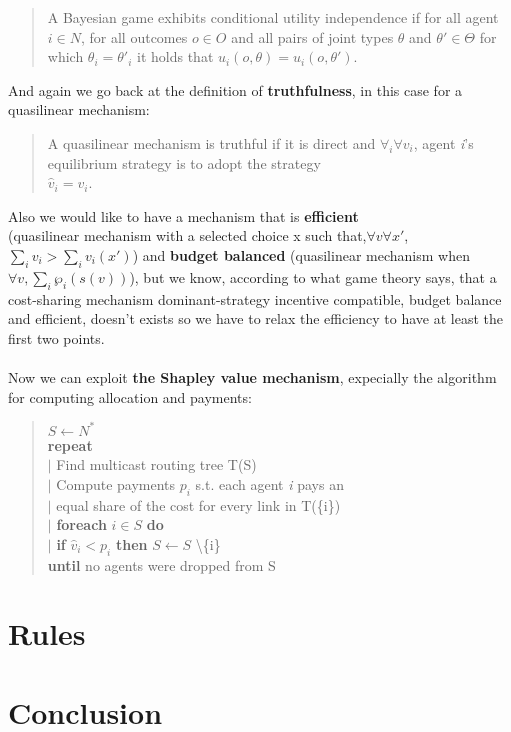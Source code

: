 \documentclass{article}
\begin{document}
{\begin{quote}
    A Bayesian game exhibits conditional utility independence if for all agent $i \in N$, for all outcomes $o \in O$ and all pairs of joint types $\theta$ and $\theta' \in \Theta$ for which $\theta_i = \theta'_i$ it holds that $u_i(o,\theta) = u_i(o,\theta')$. 
\end{quote}
And again we go back at the definition of \textbf{truthfulness}, in this case for a quasilinear mechanism:
\begin{quote}
    A quasilinear mechanism is truthful if it is direct and $\forall _i \forall v_i$, agent \textit{i}'s equilibrium strategy is to adopt the strategy\\ $\hat{v}_i = v_i$.
\end{quote}
Also we would like to have a mechanism that is \textbf{efficient} \\(quasilinear mechanism with a selected choice x such that,\newpage $\forall v \forall x'$, $\displaystyle \sum_{i} v_i > \displaystyle \sum_{i} v_i(x')$) and \textbf{budget balanced} (quasilinear mechanism when $\forall v,\displaystyle\sum_{i} \wp_i (s(v))$), but we know, according to what game theory says, that a cost-sharing mechanism dominant-strategy incentive compatible, budget balance and efficient, doesn't exists so we have to relax the efficiency to have at least the first two points.\\
\\Now we can exploit \textbf{the Shapley value mechanism}, expecially the algorithm for computing allocation and payments:
\begin{quote}
    $S \leftarrow N^*$\\
    \textbf{repeat}\\
    $\vert$ Find multicast routing tree T(S)\\
    $\vert$ Compute payments $p_i$ s.t. each agent \textit{i} pays an\\
    $\vert$ equal share of the cost for every link in T(\{i\})\\
    $\vert$ \textbf{foreach} $i \in S$ \textbf{do}\\
    $\vert$ \qquad \textbf{if} $\hat{v}_i < p_i$ \textbf{then} $S \leftarrow S$ \textbackslash \{i\}\\
    \textbf{until} no agents were dropped from S
\end{quote}

}
\section{Rules}
\section{Conclusion}
\end{document}

